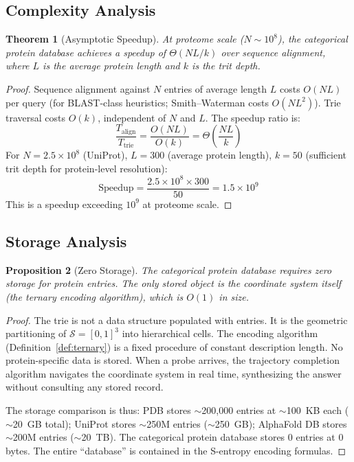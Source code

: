 \documentclass[11pt,twocolumn,a4paper]{article}
\newtheorem{theorem}{Theorem}[section]
\newtheorem{proposition}[theorem]{Proposition}
\theoremstyle{definition}
\theoremstyle{remark}
\newcommand{\Sspace}{\mathcal{S}}
\begin{document}
\subsection{Complexity Analysis}

\begin{theorem}[Asymptotic Speedup]
\label{thm:speedup}
At proteome scale ($N \sim 10^8$), the categorical protein database achieves a speedup of $\Theta(NL/k)$ over sequence alignment, where $L$ is the average protein length and $k$ is the trit depth.
\end{theorem}

\begin{proof}
Sequence alignment against $N$ entries of average length $L$ costs $O(NL)$ per query (for BLAST-class heuristics; Smith--Waterman costs $O(NL^2)$). Trie traversal costs $O(k)$, independent of $N$ and $L$. The speedup ratio is:
\begin{equation}
\frac{T_{\mathrm{align}}}{T_{\mathrm{trie}}} = \frac{O(NL)}{O(k)} = \Theta\left(\frac{NL}{k}\right)
\end{equation}
For $N = 2.5 \times 10^8$ (UniProt), $L = 300$ (average protein length), $k = 50$ (sufficient trit depth for protein-level resolution):
\begin{equation}
\text{Speedup} = \frac{2.5 \times 10^8 \times 300}{50} = 1.5 \times 10^9
\end{equation}
This is a speedup exceeding $10^9$ at proteome scale.
\end{proof}

\subsection{Storage Analysis}

\begin{proposition}[Zero Storage]
\label{prop:storage}
The categorical protein database requires zero storage for protein entries. The only stored object is the coordinate system itself (the ternary encoding algorithm), which is $O(1)$ in size.
\end{proposition}

\begin{proof}
The trie is not a data structure populated with entries. It is the geometric partitioning of $\Sspace = [0,1]^3$ into hierarchical cells. The encoding algorithm (Definition~\ref{def:ternary}) is a fixed procedure of constant description length. No protein-specific data is stored. When a probe arrives, the trajectory completion algorithm navigates the coordinate system in real time, synthesizing the answer without consulting any stored record.

The storage comparison is thus: PDB stores $\sim$200{,}000 entries at $\sim$100~KB each ($\sim$20~GB total); UniProt stores $\sim$250M entries ($\sim$250~GB); AlphaFold DB stores $\sim$200M entries ($\sim$20~TB). The categorical protein database stores 0 entries at 0 bytes. The entire ``database'' is contained in the S-entropy encoding formulas.
\end{proof}
\end{document}
